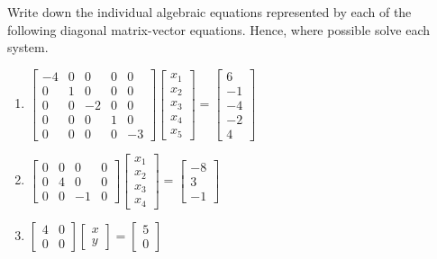 \begin{exercise} \label{ex:} 
Write down the individual algebraic equations represented by each of the following diagonal matrix-vector equations.
Hence, where possible solve each system.
\begin{enumerate}
\item \(\begin{bmatrix} -4&0&0&0&0
\\0&1&0&0&0
\\0&0&-2&0&0
\\0&0&0&1&0
\\0&0&0&0&-3 \end{bmatrix}
\begin{bmatrix}x_1\\x_2\\x_3\\x_4\\x_5\end{bmatrix}
=\begin{bmatrix} 6
\\-1
\\-4
\\-2
\\4 \end{bmatrix}\)

\item \(\begin{bmatrix} 0&0&0&0
\\0&4&0&0
\\0&0&-1&0 \end{bmatrix}
\begin{bmatrix}x_1\\x_2\\x_3\\x_4\end{bmatrix}
=\begin{bmatrix} -8
\\3
\\-1 \end{bmatrix}\)

\item \(\begin{bmatrix} 4&0
\\0&0 \end{bmatrix}
\begin{bmatrix}x\\y\end{bmatrix}
=\begin{bmatrix} 5
\\0 \end{bmatrix}\)


\end{enumerate}
\end{exercise}
